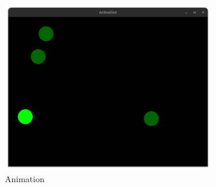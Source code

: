 \begin{figure}[H]
    \centering
    \includegraphics[width=0.8\textwidth]{src/img/sfml_animation.png}
    \caption{Animation}
    \label{fig:animation}
\end{figure}

